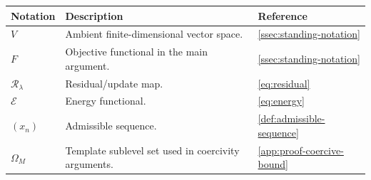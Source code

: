 \begin{tabularx}{\textwidth}{@{} >{\raggedright\arraybackslash}p{2.7cm} p{6.0cm} X @{}}
\toprule
\textbf{Notation} & \textbf{Description} & \textbf{Reference} \\
\midrule
$V$ & Ambient finite-dimensional vector space. & \cref{ssec:standing-notation} \\
$F$ & Objective functional in the main argument. & \cref{ssec:standing-notation} \\
$\mathcal{R}_\lambda$ & Residual/update map. & \cref{eq:residual} \\
$\mathcal{E}$ & Energy functional. & \cref{eq:energy} \\
$(x_n)$ & Admissible sequence. & \cref{def:admissible-sequence} \\
\(\Omega_M\) & Template sublevel set used in coercivity arguments. & \cref{app:proof-coercive-bound} \\
\bottomrule
\end{tabularx}
